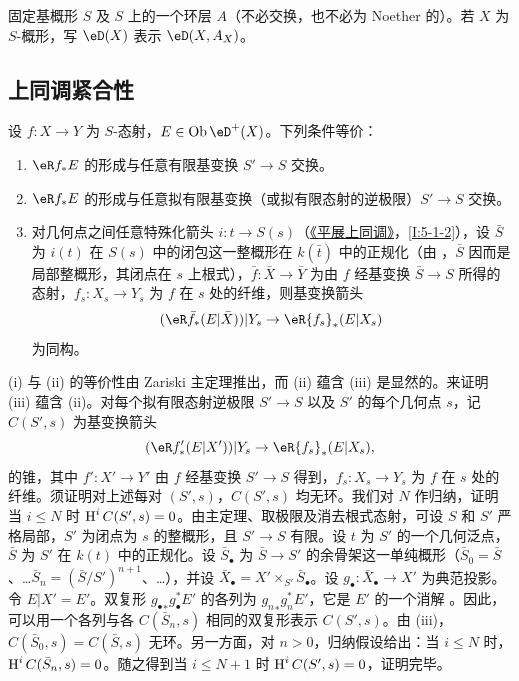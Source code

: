 固定基概形 $S$ 及 $S$ 上的一个环层 $A$（不必交换，也不必为 Noether 的）。若 $X$ 为 $S$-概形，写 $\eD(X)$ 表示 $\eD(X,A_X)$。

\subsection{上同调紧合性}\label{VII:5-1}

\begin{proposition}\label{VII:5-1-1}
设 $f:X\to Y$ 为 $S$-态射，$E\in\ob \eD^+(X)$。下列条件等价：
\begin{enumerate}[\indent (i)]
  \item $\eR f_\ast E$ 的形成与任意有限基变换 $S'\to S$ 交换。
  \item $\eR f_\ast E$ 的形成与任意拟有限基变换（或拟有限态射的逆极限）$S'\to S$ 交换。
  \item 对几何点之间任意特殊化箭头 $i:t\to S(s)$（\hyperref[I]{《平展上同调》}，\ref{I:5-1-2}），设 $\bar S$ 为 $i(t)$ 在 $S(s)$ 中的闭包这一整概形在 $k(\bar t)$ 中的正规化（由 \cite[IV, 6.15.5, 18.5.11, 18.8.16]{ega}，$\bar S$ 因而是局部整概形，其闭点在 $s$ 上根式），$\bar f:\bar X\to \bar Y$ 为由 $f$ 经基变换 $\bar S\to S$ 所得的态射，$f_s:X_s\to Y_s$ 为 $f$ 在 $s$ 处的纤维，则基变换箭头
    \[
      (\eR \bar f_\ast (E|\bar X))|Y_s \to \eR {f_s}_\ast(E|X_s)
    \]
    为同构。
\end{enumerate}
\end{proposition}

(i) 与 (ii) 的等价性由 Zariski 主定理推出，而 (ii) 蕴含 (iii) 是显然的。来证明 (iii) 蕴含 (ii)。对每个拟有限态射逆极限 $S'\to S$ 以及 $S'$ 的每个几何点 $s$，记 $C(S',s)$ 为基变换箭头
\[
  (\eR f'_\ast(E|X'))|Y_s \to \eR{f_s}_\ast (E|X_s) \text{,}
\]
的锥，其中 $f':X'\to Y'$ 由 $f$ 经基变换 $S'\to S$ 得到，$f_s:X_s\to Y_s$ 为 $f$ 在 $s$ 处的纤维。须证明对上述每对 $(S',s)$，$C(S',s)$ 均无环。我们对 $N$ 作归纳，证明当 $i\leqslant N$ 时 $\operatorname{H}^i C(S',s) = 0$。由主定理、取极限及消去根式态射，可设 $S$ 和 $S'$ 严格局部，$S'$ 为闭点为 $s$ 的整概形，且 $S'\to S$ 有限。设 $t$ 为 $S'$ 的一个几何泛点，$\bar S$ 为 $S'$ 在 $k(t)$ 中的正规化。设 $\bar S_\bullet$ 为 $\bar S\to S'$ 的余骨架这一单纯概形（$\bar S_0=\bar S$、\ldots $\bar S_n=(\bar S/S')^{n+1}$、\ldots），并设 $\bar X_\bullet=X'\times_{S'} \bar S_\bullet$。设 $g_\bullet:\bar X_\bullet \to X'$ 为典范投影。令 $E|X'=E'$。双复形 ${g_\bullet}_\ast g_\bullet^\ast E'$ 的各列为 ${g_n}_\ast g_n^\ast E'$，它是 $E'$ 的一个消解 \cite[VIII 8]{sga4}。因此，可以用一个各列与各 $C(\bar S_n,s)$ 相同的双复形表示 $C(S',s)$。由 (iii)，$C(\bar S_0,s)=C(\bar S,s)$ 无环。另一方面，对 $n>0$，归纳假设给出：当 $i\leqslant N$ 时，$\operatorname{H}^i C(\bar S_n,s)=0$。随之得到当 $i\leqslant N+1$ 时 $\operatorname{H}^i C(S',s)=0$，证明完毕。

